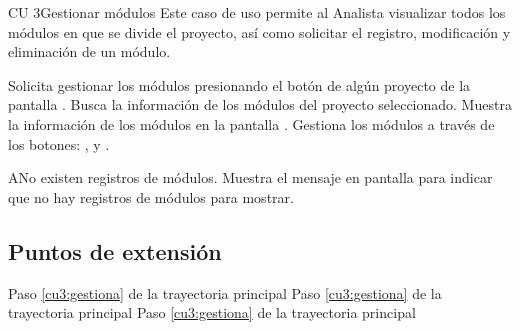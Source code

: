 \begin{UseCase}{CU 3}{Gestionar módulos}
	{
		Este caso de uso permite al Analista visualizar todos los módulos en que se divide el proyecto, así como solicitar el registro, modificación y eliminación de un módulo.
	}
	
	

	


\end{UseCase}
 \begin{UCtrayectoria}
    \UCpaso[\UCactor] Solicita gestionar los módulos presionando el botón \btnEntrar de algún proyecto de la pantalla .
    \UCpaso[\UCsist] Busca la información de los módulos del proyecto seleccionado. 
    \UCpaso[\UCsist] Muestra la información de los módulos en la pantalla .
    \UCpaso[\UCactor] Gestiona los módulos a través de los botones: , \btnEditar y \btnEliminar. \label{cu3:gestiona}
 \end{UCtrayectoria}
 
 \begin{UCtrayectoriaA}{A}{No existen registros de módulos.}
    \UCpaso[\UCsist] Muestra el mensaje  en pantalla  
    para indicar que no hay registros de módulos para mostrar.
 \end{UCtrayectoriaA}
 

\subsection{Puntos de extensión}

	{Paso \ref{cu3:gestiona} de la trayectoria principal}
	{}
	{Paso \ref{cu3:gestiona} de la trayectoria principal}
	{}	
	{Paso \ref{cu3:gestiona} de la trayectoria principal}
	{}